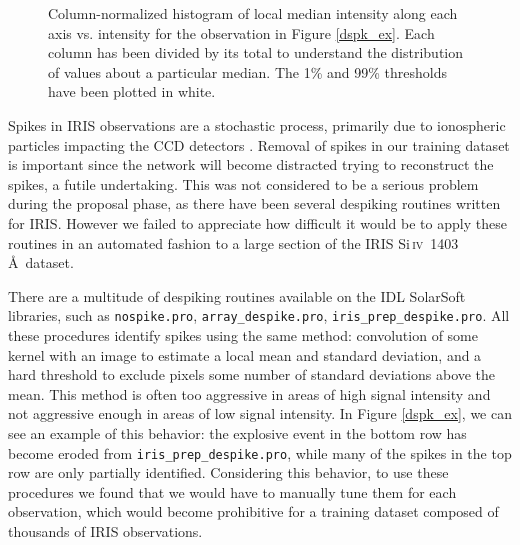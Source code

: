 \documentclass[10pt,letterpaper]{article}
\newcommand{\SiIV}{Si\,\textsc{iv}~1403\,\AA}
\begin{document}
\begin{figure}[t!]
				\caption{Column-normalized histogram of local median intensity along each axis vs. intensity for the observation in Figure \ref{dspk_ex}.
					Each column has been divided by its total to understand the distribution of values about a particular median.
					The 1\% and 99\% thresholds have been plotted in white.
					}
				
				\label{dspk_hist}
				
			\end{figure}
			
			Spikes in IRIS observations are a stochastic process, primarily due to ionospheric particles impacting the CCD detectors \citep{itn15}.
			Removal of spikes in our training dataset is important since the network will become distracted trying to reconstruct the spikes, a futile undertaking.
			This was not considered to be a serious problem during the proposal phase, as there have been several despiking routines written for IRIS.
			However we failed to appreciate how difficult it would be to apply these routines in an automated fashion to a large section of the IRIS \SiIV\ dataset.
			
			There are a multitude of despiking routines available on the IDL SolarSoft libraries, such as \texttt{nospike.pro}, \texttt{array\_despike.pro}, \texttt{iris\_prep\_despike.pro}.
			All these procedures identify spikes using the same method: convolution of some kernel with an image to estimate a local mean and standard deviation, and a hard threshold to exclude pixels some number of standard deviations above the mean.
			This method is often too aggressive in areas of high signal intensity and not aggressive enough in areas of low signal intensity.
			In Figure \ref{dspk_ex}, we can see an example of this behavior: the explosive event in the bottom row has become eroded from \texttt{iris\_prep\_despike.pro}, while many of the spikes in the top row are only partially identified.
			Considering this behavior, to use these procedures we found that we would have to manually tune them for each observation, which would become prohibitive for a training dataset composed of thousands of IRIS observations.
			
\end{document}
